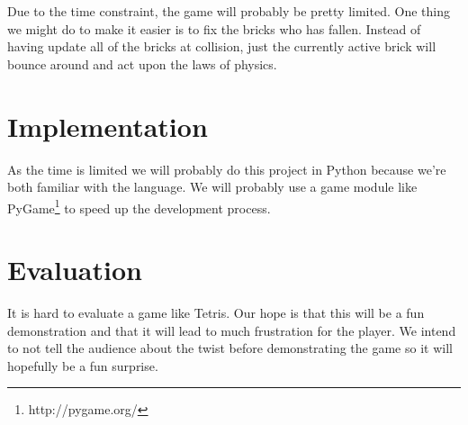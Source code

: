 \documentclass[11pt]{article} %
\begin{document}
Due to the time constraint, the game will probably be pretty limited. One thing we might do to make it easier is to fix the bricks who has fallen. Instead of having update all of the bricks at collision, just the currently active brick will bounce around and act upon the laws of physics.

\section{Implementation}
As the time is limited we will probably do this project in Python because we're both familiar with the language. We will probably use a game module like PyGame\footnote{http://pygame.org/} to speed up the development process.

\section{Evaluation}
It is hard to evaluate a game like Tetris. Our hope is that this will be a fun demonstration and that it will lead to much frustration for the player. We intend to not tell the audience about the twist before demonstrating the game so it will hopefully be a fun surprise.
\end{document}
